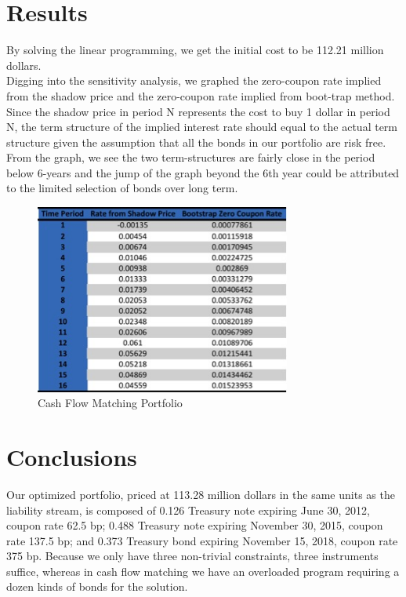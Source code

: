 \documentclass[oneside,12pt]{report}
\begin{document}
	


\chapter{Results}\label{}

By solving the linear programming, we get the initial cost to be 112.21 million dollars.\\

\noindent Digging into the sensitivity analysis, we graphed the zero-coupon rate implied from the shadow price and the zero-coupon rate implied from boot-trap method. Since the shadow price in period N represents the cost to buy 1 dollar in period N, the term structure of the implied interest rate should equal to the actual term structure given the assumption that all the bonds in our portfolio are risk free. From the graph, we see the two term-structures are fairly close in the period below 6-years and the jump of the graph beyond the 6th year could be attributed to the limited selection of bonds over long term.\\

\begin{figure}[htb]
  \begin{center}
      \includegraphics[width=0.75\textwidth]
{cf.jpg}
    \end{center}
    \caption{Cash Flow Matching Portfolio}
\end{figure}

\chapter{Conclusions}\label{}
		        
Our optimized portfolio, priced at 113.28 million dollars in the same units as the liability stream, is composed of 0.126 Treasury note expiring June 30, 2012, coupon rate 62.5 bp; 0.488 Treasury note expiring November 30, 2015, coupon rate 137.5 bp; and 0.373 Treasury bond expiring November 15, 2018, coupon rate 375 bp. Because we only have three non-trivial constraints, three instruments suffice, whereas in cash flow matching we have an overloaded program requiring a dozen kinds of bonds for the solution.\\
\end{document}
